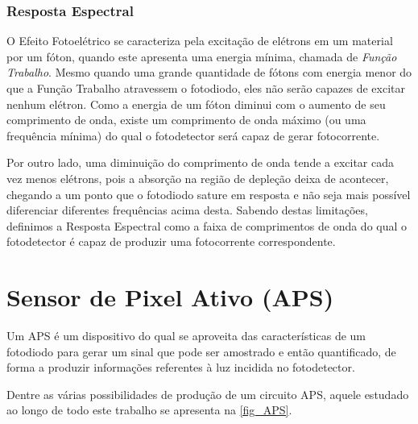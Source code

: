 \subsubsection{Resposta Espectral}

O Efeito Fotoel\'etrico se caracteriza pela excitação de el\'etrons em um material por um fóton, quando este apresenta uma energia mínima, chamada de \textit{Função Trabalho}. Mesmo quando uma grande quantidade de fótons com energia menor do que a Função Trabalho atravessem o fotodiodo, eles não serão capazes de excitar nenhum el\'etron. Como a energia de um fóton diminui com o aumento de seu comprimento de onda, existe um comprimento de onda máximo (ou uma frequência mínima) do qual o fotodetector será capaz de gerar fotocorrente.

Por outro lado, uma diminuição do comprimento de onda tende a excitar cada vez menos el\'etrons, pois a absorção na região de depleção deixa de acontecer, chegando a um ponto que o fotodiodo sature em resposta e não seja mais possível diferenciar diferentes frequências acima desta.
Sabendo destas limitações, definimos a Resposta Espectral como a faixa de comprimentos de onda do qual o fotodetector \'e capaz de produzir uma fotocorrente correspondente.

\section{Sensor de Pixel Ativo (APS)}
\label{section:APS}
Um APS \'e um dispositivo do qual se aproveita das características de um fotodiodo para gerar um sinal que pode ser amostrado e então quantificado, de forma a produzir informações referentes à luz incidida no fotodetector.

Dentre as várias possibilidades de produção de um circuito APS, aquele estudado ao longo de todo este trabalho se apresenta na \autoref{fig_APS}.

